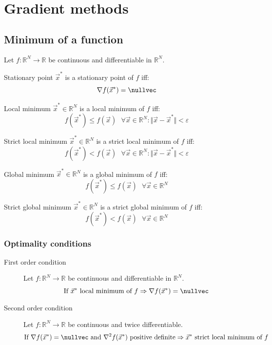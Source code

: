 \chapter{Gradient methods}


\section{Minimum of a function}

Let $f: \mathbb{R}^N \rightarrow \mathbb{R}$ be continuous and differentiable in $\mathbb{R}^N$.
\begin{descriptionlist}
    \item[Stationary point] 
        $\vec{x}^*$ is a stationary point of $f$ iff: 
        \[ \nabla f(\vec{x}^*) = \nullvec \]

    \item[Local minimum] 
        $\vec{x}^* \in \mathbb{R}^N$ is a local minimum of $f$ iff:
        \[ f(\vec{x}^*) \leq f(\vec{x}) \text{ } \forall \vec{x} \in \mathbb{R}^N: \Vert \vec{x} - \vec{x}^* \Vert < \varepsilon \]
        
    \item[Strict local minimum] 
        $\vec{x}^* \in \mathbb{R}^N$ is a strict local minimum of $f$ iff:
        \[ f(\vec{x}^*) < f(\vec{x}) \text{ } \forall \vec{x} \in \mathbb{R}^N: \Vert \vec{x} - \vec{x}^* \Vert < \varepsilon \]

    \item[Global minimum] 
        $\vec{x}^* \in \mathbb{R}^N$ is a global minimum of $f$ iff:
        \[ f(\vec{x}^*) \leq f(\vec{x}) \text{ } \forall \vec{x} \in \mathbb{R}^N \]
        
    \item[Strict global minimum] 
        $\vec{x}^* \in \mathbb{R}^N$ is a strict global minimum of $f$ iff:
        \[ f(\vec{x}^*) < f(\vec{x}) \text{ } \forall \vec{x} \in \mathbb{R}^N \]
\end{descriptionlist}


\subsection{Optimality conditions}

\begin{description}
    \item[First order condition] 
        Let $f: \mathbb{R}^N \rightarrow \mathbb{R}$ be continuous and differentiable in $\mathbb{R}^N$.
        \[ \text{If } \vec{x}^* \text{ local minimum of } f \Rightarrow \nabla f(\vec{x}^*) = \nullvec \]

    \item[Second order condition] 
        Let $f: \mathbb{R}^N \rightarrow \mathbb{R}$ be continuous and twice differentiable.
        \[ 
            \text{If } \nabla f(\vec{x}^*) = \nullvec \text{ and } \nabla^2 f(\vec{x}^*) \text{ positive definite} \Rightarrow 
            \vec{x}^* \text{ strict local minimum of } f 
        \]
\end{description}

